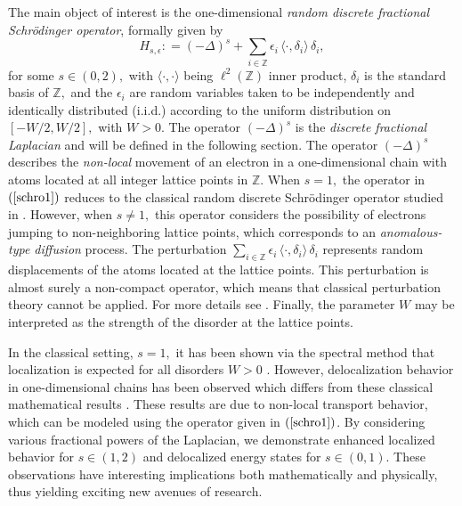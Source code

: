 \documentclass[final,1p,times]{elsarticle}
\def\ZZ{\mathbb Z} %
\newcommand{\bb}[1]{\begin{equation}\label{#1}}
\newcommand{\ee}{\end{equation}}
\def\R#1{$(\ref{#1})$}
\theoremstyle{remark}
\theoremstyle{definition}
\begin{document}
The main object of interest is the one-dimensional {\em random discrete fractional Schr{\"o}dinger operator}, formally given by
\bb{schro1}
H_{s,\epsilon} \mathrel{\mathop:}= (-\Delta)^s + \sum_{i\in\ZZ} \epsilon_i \,\langle \cdot, \delta_i\rangle\, \delta_i,
\ee
for some $s\in (0,2),$ with $\langle \cdot,\cdot\rangle$ being $\ell^2(\ZZ)$ inner product, $\delta_i$ is the standard basis of $\ZZ,$ and the $\epsilon_i$ are random variables taken to be independently and identically distributed (i.i.d.) according to the uniform distribution on $[-W/2,W/2],$ with $W>0.$ The operator $(-\Delta)^s$ is the {\em discrete fractional Laplacian} and will be defined in the following section. The operator $(-\Delta)^s$ describes the {\em non-local} movement of an electron in a one-dimensional chain with atoms located at all integer lattice points in $\ZZ.$ When $s=1,$ the operator in \R{schro1} reduces to the classical random discrete Schr{\"o}dinger operator studied in \cite{jakvsic2000spectral}. However, when $s\neq 1,$ this operator considers the possibility of electrons jumping to non-neighboring lattice points, which corresponds to an {\em anomalous-type diffusion} process. The perturbation $\textstyle\sum_{i\in\ZZ} \epsilon_i \,\langle \cdot, \delta_i\rangle\, \delta_i$ represents random displacements of the atoms located at the lattice points. This perturbation is almost surely a non-compact operator, which means that classical perturbation theory cannot be applied. For more details see \cite{birman2012spectral,kato2013perturbation}. Finally, the parameter $W$ may be interpreted as the strength of the disorder at the lattice points.

In the classical setting, $s=1,$ it has been shown via the spectral method that localization is expected for all disorders $W>0$ \cite{Liaw2013}. However, delocalization behavior in one-dimensional chains has been observed which differs from these classical mathematical results \cite{SHIMA2005422}. 
These results are due to non-local transport behavior, which can be modeled using the operator given in \R{schro1}.
By considering various fractional powers of the Laplacian, we demonstrate enhanced localized behavior for $s\in(1,2)$ and delocalized energy states for $s\in(0,1).$
These observations have interesting implications both mathematically and physically, thus yielding exciting new avenues of research.
\end{document}
